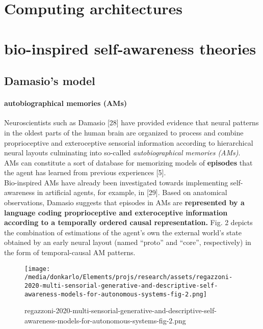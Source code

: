 \documentclass{article}
\begin{document}
	\section{Computing architectures}
		\cite{sanz-2009-systems-models-and-self-awareness-towards-architectural-models-of-consciousness}
	\section{bio-inspired self-awareness theories}
		\subsection{Damasio’s model}
			\paragraph{autobiographical memories (AMs)} Neuroscientists such as Damasio \citet{regazzoni-2020-multi-sensorial-generative-and-descriptive-self-awareness-models-for-autonomous-systems}[28] have provided evidence that neural patterns in the oldest parts of the human brain are organized to process and combine proprioceptive and exteroceptive sensorial information according to hierarchical neural layouts culminating into so-called \emph{autobiographical memories (AMs)}. 
			\\
			AMs can constitute a sort of database for memorizing models of \textbf{episodes} that the agent has learned from previous experiences \citet{regazzoni-2020-multi-sensorial-generative-and-descriptive-self-awareness-models-for-autonomous-systems}[5]. 
			\\
			Bio-inspired AMs have already been investigated towards implementing self-awareness in
			artificial agents, for example, in \citet{regazzoni-2020-multi-sensorial-generative-and-descriptive-self-awareness-models-for-autonomous-systems}[29]. Based on anatomical observations, Damasio suggests that episodes in AMs are \textbf{represented by a language coding proprioceptive and exteroceptive information according to a temporally ordered causal representation.} Fig. 2 depicts the combination of estimations
			of the agent’s own the external world’s state obtained by an
			early neural layout (named “proto” and “core”, respectively)
			in the form of temporal-causal AM patterns.
			\begin{figure*}
				\centering
				\texttt{[image: /media/donkarlo/Elements/projs/research/assets/regazzoni-2020-multi-sensorial-generative-and-descriptive-self-awareness-models-for-autonomous-systems-fig-2.png]}
				\caption{regazzoni-2020-multi-sensorial-generative-and-descriptive-self-awareness-models-for-autonomous-systems-fig-2.png}
				\label{fig:regazzoni-2020-multi-sensorial-generative-and-descriptive-self-awareness-models-for-autonomous-systems-fig-2.png}
			\end{figure*}
\end{document}
